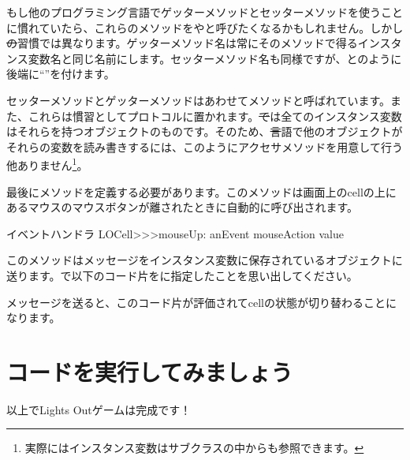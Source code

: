 \documentclass[a4paper,10pt,twoside]{book}
\begin{document}
もし他のプログラミング言語でゲッターメソッドとセッターメソッドを使うことに慣れていたら、これらのメソッドをやと呼びたくなるかもしれません。しかし\st の習慣では異なります。ゲッターメソッド名は常にそのメソッドで得るインスタンス変数名と同じ名前にします。セッターメソッド名も同様ですが、とのように後端に``\ct{:}''を付けます。

セッターメソッドとゲッターメソッドはあわせてメソッドと呼ばれています。また、これらは慣習としてプロトコルに置かれます。\st では全てのインスタンス変数はそれらを持つオブジェクトのものです。そのため、\st 言語で他のオブジェクトがそれらの変数を読み書きするには、このようにアクセサメソッドを用意して行う他ありません\footnote{実際にはインスタンス変数はサブクラスの中からも参照できます。}。


最後にメソッドを定義する必要があります。このメソッドは画面上のcellの上にあるマウスのマウスボタンが離されたときに自動的に呼び出されます。

\begin{method}[sbecellmouseup]{イベントハンドラ}
LOCell>>>mouseUp: anEvent
   mouseAction value
\end{method}



このメソッドはメッセージをインスタンス変数に保存されているオブジェクトに送ります。で以下のコード片をに指定したことを思い出してください。


\noindent
{}メッセージを送ると、このコード片が評価されてcellの状態が切り替わることになります。

\section{コードを実行してみましょう}

以上でLights Outゲームは完成です！
\end{document}
